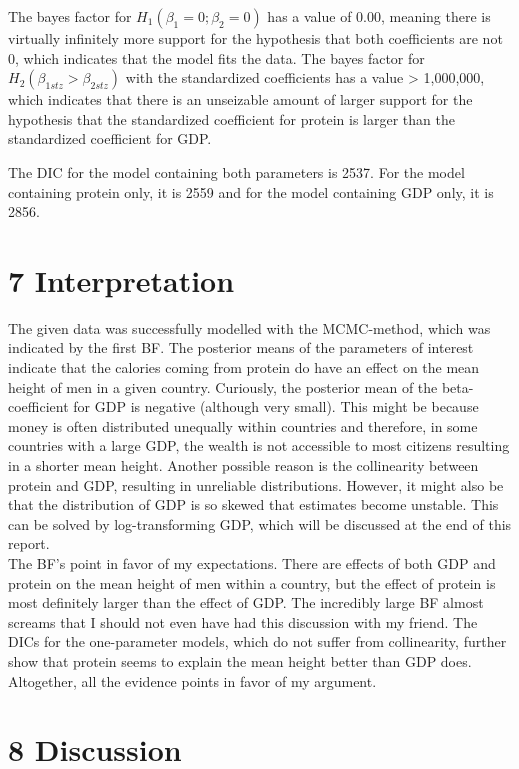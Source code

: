 \documentclass[
]{article}
\begin{document}
The bayes factor for \(H_1 (\beta_1 = 0; \beta_2 = 0)\) has a value of
0.00, meaning there is virtually infinitely more support for the
hypothesis that both coefficients are not 0, which indicates that the
model fits the data. The bayes factor for
\(H_2 (\beta_{1stz}> \beta_{2stz})\) with the standardized coefficients
has a value \textgreater{} 1,000,000, which indicates that there is an
unseizable amount of larger support for the hypothesis that the
standardized coefficient for protein is larger than the standardized
coefficient for GDP.

The DIC for the model containing both parameters is 2537. For the model
containing protein only, it is 2559 and for the model containing GDP
only, it is 2856.

\hypertarget{interpretation}{%
\section{7 Interpretation}\label{interpretation}}

The given data was successfully modelled with the MCMC-method, which was
indicated by the first BF. The posterior means of the parameters of
interest indicate that the calories coming from protein do have an
effect on the mean height of men in a given country. Curiously, the
posterior mean of the beta-coefficient for GDP is negative (although
very small). This might be because money is often distributed unequally
within countries and therefore, in some countries with a large GDP, the
wealth is not accessible to most citizens resulting in a shorter mean
height. Another possible reason is the collinearity between protein and
GDP, resulting in unreliable distributions. However, it might also be
that the distribution of GDP is so skewed that estimates become
unstable. This can be solved by log-transforming GDP, which will be
discussed at the end of this report.\\
The BF's point in favor of my expectations. There are effects of both
GDP and protein on the mean height of men within a country, but the
effect of protein is most definitely larger than the effect of GDP. The
incredibly large BF almost screams that I should not even have had this
discussion with my friend. The DICs for the one-parameter models, which
do not suffer from collinearity, further show that protein seems to
explain the mean height better than GDP does. Altogether, all the
evidence points in favor of my argument.

\hypertarget{discussion}{%
\section{8 Discussion}\label{discussion}}
\end{document}
